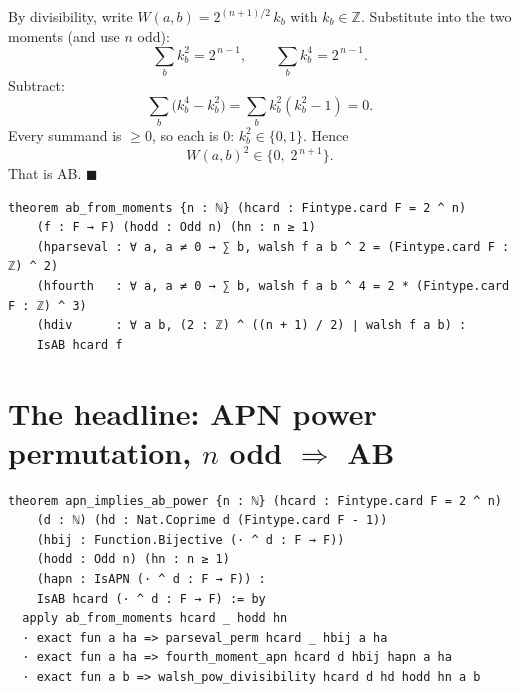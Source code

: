 \documentclass[11pt]{article}
\begin{document}
\noindent
By divisibility, write $W(a,b)=2^{(n+1)/2}\,k_b$ with $k_b\in\mathbb{Z}$.
Substitute into the two moments (and use $n$ odd):
\[
\sum_b k_b^2 = 2^{\,n-1},
\qquad
\sum_b k_b^4 = 2^{\,n-1}.
\]
Subtract:
\[
\sum_b \bigl(k_b^4-k_b^2\bigr)=\sum_b k_b^2(k_b^2-1)=0 .
\]
Every summand is $\ge 0$, so each is $0$: $k_b^2\in\{0,1\}$. Hence
\[
W(a,b)^2 \in \{0,\;2^{\,n+1}\}.
\]
That is AB. \hfill$\blacksquare$

\begin{lstlisting}
theorem ab_from_moments {n : ℕ} (hcard : Fintype.card F = 2 ^ n)
    (f : F → F) (hodd : Odd n) (hn : n ≥ 1)
    (hparseval : ∀ a, a ≠ 0 → ∑ b, walsh f a b ^ 2 = (Fintype.card F : ℤ) ^ 2)
    (hfourth   : ∀ a, a ≠ 0 → ∑ b, walsh f a b ^ 4 = 2 * (Fintype.card F : ℤ) ^ 3)
    (hdiv      : ∀ a b, (2 : ℤ) ^ ((n + 1) / 2) ∣ walsh f a b) :
    IsAB hcard f
\end{lstlisting}


\bigskip

\section{The headline: APN power permutation, $n$ odd $\Rightarrow$ AB}

\begin{lstlisting}
theorem apn_implies_ab_power {n : ℕ} (hcard : Fintype.card F = 2 ^ n)
    (d : ℕ) (hd : Nat.Coprime d (Fintype.card F - 1))
    (hbij : Function.Bijective (· ^ d : F → F))
    (hodd : Odd n) (hn : n ≥ 1)
    (hapn : IsAPN (· ^ d : F → F)) :
    IsAB hcard (· ^ d : F → F) := by
  apply ab_from_moments hcard _ hodd hn
  · exact fun a ha => parseval_perm hcard _ hbij a ha
  · exact fun a ha => fourth_moment_apn hcard d hbij hapn a ha
  · exact fun a b => walsh_pow_divisibility hcard d hd hodd hn a b
\end{lstlisting}

\end{document}
